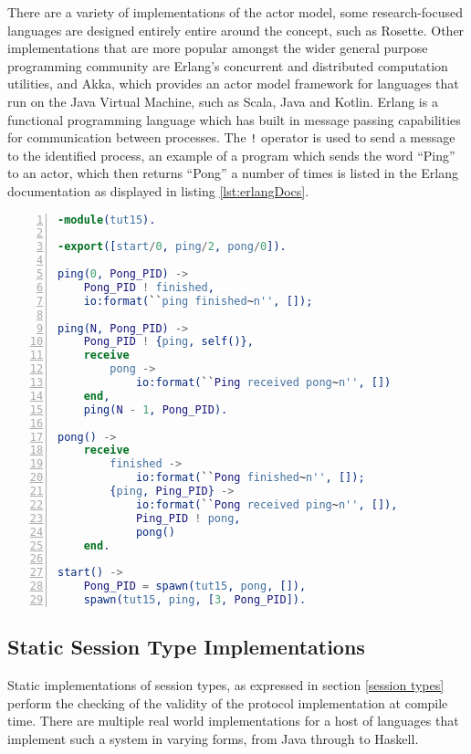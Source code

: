 \documentclass{article}
\begin{document}
	There are a variety of implementations of the actor model, some research-focused languages are designed entirely entire around the concept, such as Rosette\cite{Tomlinson:1988:ROC:67387.67410}. Other implementations that are more popular amongst the wider general purpose programming community are Erlang’s concurrent and distributed computation utilities, and Akka, which provides an actor model framework for languages that run on the Java Virtual Machine, such as Scala, Java and Kotlin. 
	Erlang is a functional programming language which has built in message passing capabilities for communication between processes. The \texttt{!} operator is used to send a message to the identified process, an example of a program which sends the word “Ping” to an actor, which then returns “Pong” a number of times is listed in the Erlang documentation\cite{ErlangConcDocs} as displayed in listing \ref{lst:erlangDocs}.
	\begin{lstlisting}[label={lst:erlangDocs}, language=erlang, frame=single, numbers=left, caption=Ping Pong in concurrent Erlang\cite{ErlangConcDocs}]
-module(tut15).

-export([start/0, ping/2, pong/0]).

ping(0, Pong_PID) ->
	Pong_PID ! finished,
	io:format(``ping finished~n'', []);

ping(N, Pong_PID) ->
	Pong_PID ! {ping, self()},
	receive
		pong ->
			io:format(``Ping received pong~n'', [])
	end,
	ping(N - 1, Pong_PID).

pong() ->
	receive
		finished ->
			io:format(``Pong finished~n'', []);
		{ping, Ping_PID} ->
			io:format(``Pong received ping~n'', []),
			Ping_PID ! pong,
			pong()
	end.

start() ->
	Pong_PID = spawn(tut15, pong, []),
	spawn(tut15, ping, [3, Pong_PID]).
	\end{lstlisting}
	\subsection{Static Session Type Implementations}
	Static implementations of session types, as expressed in section \ref{session types} perform the checking of the validity of the protocol implementation at compile time. There are multiple real world implementations for a host of languages that implement such a system in varying forms, from Java through to Haskell\cite{lindley2016embedding}. 
	
\end{document}
